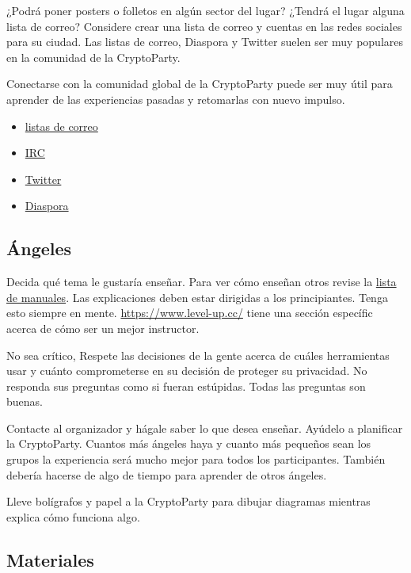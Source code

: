 \documentclass[10pt,a5paper,twoside,,]{book}
\providecommand{\tightlist}{%
  \setlength{\itemsep}{0pt}\setlength{\parskip}{0pt}}
\begin{document}
¿Podrá poner posters o folletos en algún sector del lugar? ¿Tendrá el
lugar alguna lista de correo? Considere crear una lista de correo y
cuentas en las redes sociales para su ciudad. Las listas de correo,
Diaspora y Twitter suelen ser muy populares en la comunidad de la
CryptoParty.

Conectarse con la comunidad global de la CryptoParty puede ser muy útil
para aprender de las experiencias pasadas y retomarlas con nuevo
impulso.

\begin{itemize}
\tightlist
\item
  \href{https://cryptoparty.in/communication/mailinglists}{listas de
  correo}
\item
  \href{https://cryptoparty.in/communication/irc}{IRC}
\item
  \href{https://twitter.com/search?q=\%23cryptoparty\&mode=users}{Twitter}
\item
  \href{https://wk3.org/u/cryptoparty}{Diaspora}
\end{itemize}

\subsection{Ángeles}\label{uxe1ngeles}

Decida qué tema le gustaría enseñar. Para ver cómo enseñan otros revise
la \href{https://www.cryptoparty.in/learn/links\#handbooks}{lista de
manuales}. Las explicaciones deben estar dirigidas a los principiantes.
Tenga esto siempre en mente. \url{https://www.level-up.cc/} tiene una
sección específic acerca de cómo ser un mejor instructor.

No sea crítico, Respete las decisiones de la gente acerca de cuáles
herramientas usar y cuánto comprometerse en su decisión de proteger su
privacidad. No responda sus preguntas como si fueran estúpidas. Todas
las preguntas son buenas.

Contacte al organizador y hágale saber lo que desea enseñar. Ayúdelo a
planificar la CryptoParty. Cuantos más ángeles haya y cuanto más
pequeños sean los grupos la experiencia será mucho mejor para todos los
participantes. También debería hacerse de algo de tiempo para aprender
de otros ángeles.

Lleve bolígrafos y papel a la CryptoParty para dibujar diagramas
mientras explica cómo funciona algo.

\subsection{Materiales}\label{materiales}
\end{document}
